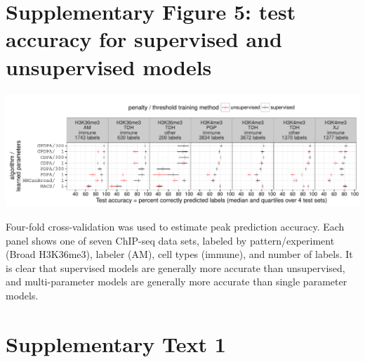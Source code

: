 \documentclass{article}
\begin{document}
\section*{Supplementary Figure 5: test accuracy for supervised and unsupervised models}

\includegraphics[width=\textwidth]{figure-test-error-dots-parameters}

Four-fold cross-validation was used to estimate peak prediction
accuracy. Each panel shows one of seven ChIP-seq data sets, labeled by
pattern/experiment (Broad H3K36me3), labeler (AM), cell types
(immune), and number of labels. It is clear that supervised models are
generally more accurate than unsupervised, and multi-parameter models
are generally more accurate than single parameter models.




\section{Supplementary Text 1}
\end{document}
